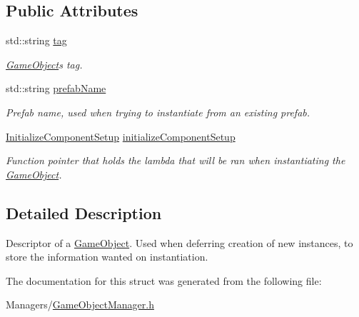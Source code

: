 \subsection*{Public Attributes}
\begin{DoxyCompactItemize}
\item 
\mbox{\label{structGameObjectDesc_a2bc7ae1aa92483492a6c5459af99267b}} 
std\+::string \hyperlink{structGameObjectDesc_a2bc7ae1aa92483492a6c5459af99267b}{tag}
\begin{DoxyCompactList}\small\item\em \hyperlink{classGameObject}{Game\+Object}\textquotesingle{}s tag. \end{DoxyCompactList}\item 
\mbox{\label{structGameObjectDesc_a2ccd0952107fff3b7f7973ba5aa14676}} 
std\+::string \hyperlink{structGameObjectDesc_a2ccd0952107fff3b7f7973ba5aa14676}{prefab\+Name}
\begin{DoxyCompactList}\small\item\em Prefab name, used when trying to instantiate from an existing prefab. \end{DoxyCompactList}\item 
\mbox{\label{structGameObjectDesc_a0efb2764311a0e433d929362dcab57d0}} 
\hyperlink{structGameObjectDesc_aa55e1f89cdd761bf046cf6ee18d847ab}{Initialize\+Component\+Setup} \hyperlink{structGameObjectDesc_a0efb2764311a0e433d929362dcab57d0}{initialize\+Component\+Setup}
\begin{DoxyCompactList}\small\item\em Function pointer that holds the lambda that will be ran when instantiating the \hyperlink{classGameObject}{Game\+Object}. \end{DoxyCompactList}\end{DoxyCompactItemize}


\subsection{Detailed Description}
Descriptor of a \hyperlink{classGameObject}{Game\+Object}. Used when deferring creation of new instances, to store the information wanted on instantiation. 

The documentation for this struct was generated from the following file\+:\begin{DoxyCompactItemize}
\item 
Managers/\hyperlink{GameObjectManager_8h}{Game\+Object\+Manager.\+h}\end{DoxyCompactItemize}
